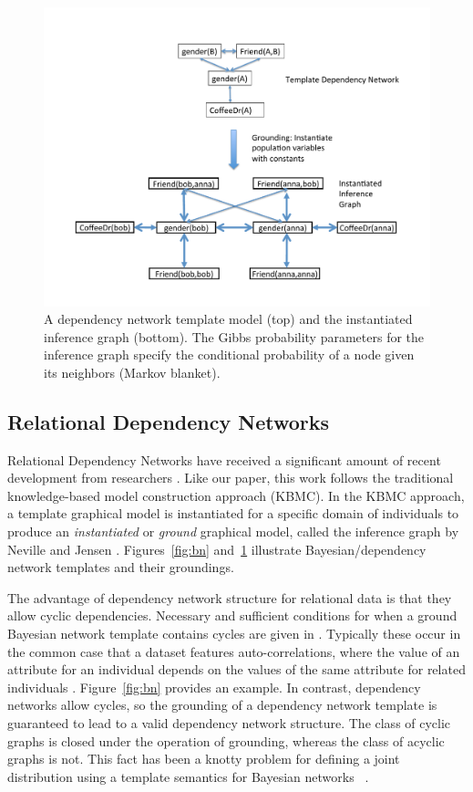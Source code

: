 \documentclass[twoside,11pt]{article}
\begin{document}
\begin{figure}[htbp]
\begin{center}
\includegraphics[width = 0.7 \textwidth]{figures/dn}
\caption{A dependency network template model (top) and the instantiated inference graph (bottom). The Gibbs probability parameters for the inference graph specify the conditional probability of a node given its neighbors (Markov blanket). \label{fig:dn}}
\end{center}
\end{figure}

 
\subsection{Relational Dependency Networks} Relational Dependency Networks have received a significant amount of recent development from researchers \cite{Neville2007,Natarajan2012}. Like our paper, this work follows the traditional knowledge-based model construction approach (KBMC). In the KBMC approach, a template graphical model is instantiated for a specific domain of individuals to produce an {\em  instantiated} or {\em ground} graphical model, called the inference graph by Neville and Jensen \cite{Neville2007}. Figures~\ref{fig:bn} and~\ref{fig:dn} illustrate Bayesian/dependency network templates and their groundings.

The advantage of dependency network structure for relational data is that they allow cyclic dependencies. Necessary and sufficient conditions for when a ground Bayesian network template contains cycles are given in \cite{Schulte2012a}.  Typically these occur in the common case that a dataset features auto-correlations, where the value of an attribute for an individual depends on the values of the same attribute for related individuals \cite{Neville2007}. Figure~\ref{fig:bn}  provides an example. In contrast, dependency networks allow cycles, so the grounding of a dependency network template is guaranteed to lead to a valid dependency network structure. The class of cyclic graphs is closed under the operation of grounding, whereas the class of acyclic graphs is not. This fact has been a knotty problem for defining a joint distribution using a template semantics for Bayesian networks ~\cite{Domingos2007,Taskar2002,Getoor2007c}. 
\end{document}
